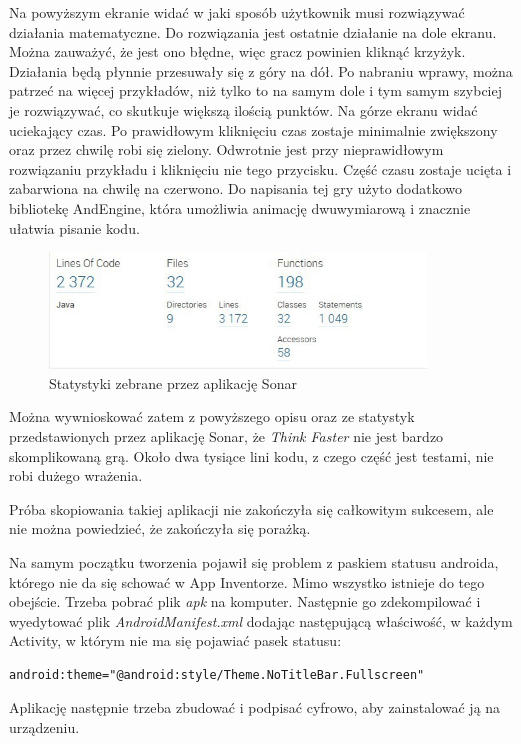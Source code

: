 Na powyższym ekranie widać w jaki sposób użytkownik musi rozwiązywać działania matematyczne. Do rozwiązania jest ostatnie działanie na dole ekranu. Można zauważyć, że jest ono błędne, więc gracz powinien kliknąć krzyżyk. Działania będą płynnie przesuwały się z góry na dół. Po nabraniu wprawy, można patrzeć na więcej przykładów, niż tylko to na samym dole i tym samym szybciej je rozwiązywać, co skutkuje większą ilością punktów. Na górze ekranu widać uciekający czas. Po prawidłowym kliknięciu czas zostaje minimalnie zwiększony oraz przez chwilę robi się zielony. Odwrotnie jest przy nieprawidłowym rozwiązaniu przykładu i kliknięciu nie tego przycisku. Część czasu zostaje ucięta i zabarwiona na chwilę na czerwono. Do napisania tej gry użyto dodatkowo bibliotekę AndEngine, która umożliwia animację dwuwymiarową i znacznie ułatwia pisanie kodu.


\begin{figure}[H]
\centering\includegraphics[width=10cm]{figures/sonarThinkFaster}
\caption{Statystyki zebrane przez aplikację Sonar}
\end{figure}

Można wywnioskować zatem z powyższego opisu oraz ze statystyk przedstawionych przez aplikację Sonar, że \emph{Think Faster} nie jest bardzo skomplikowaną grą. Około dwa tysiące lini kodu, z czego część jest testami, nie robi dużego wrażenia.

Próba skopiowania takiej aplikacji nie zakończyła się całkowitym sukcesem, ale nie można powiedzieć, że zakończyła się porażką.

Na samym początku tworzenia pojawił się problem z paskiem statusu androida, którego nie da się schować w App Inventorze. Mimo wszystko istnieje do tego obejście. Trzeba pobrać plik \emph{apk} na komputer. Następnie go zdekompilować i wyedytować plik \emph{AndroidManifest.xml} dodając następującą właściwość, w każdym Activity, w którym nie ma się pojawiać pasek statusu:
\begin{lstlisting}
android:theme="@android:style/Theme.NoTitleBar.Fullscreen"
\end{lstlisting}
Aplikację następnie trzeba zbudować i podpisać cyfrowo, aby zainstalować ją na urządzeniu.

